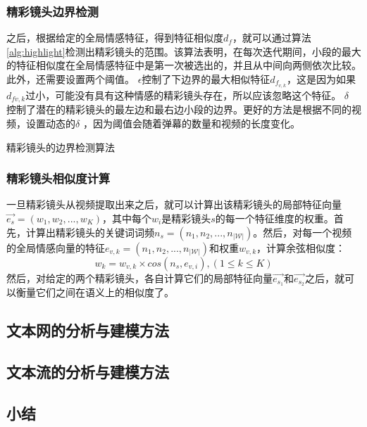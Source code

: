 \subsubsection{精彩镜头边界检测}
之后，根据给定的全局情感特征，得到特征相似度$d_f$，就可以通过算法\ref{alg:highlight}检测出精彩镜头的范围。该算法表明，在每次迭代期间，小段的最大的特征相似度在全局情感特征中是第一次被选出的，并且从中间向两侧依次比较。此外，还需要设置两个阈值。 $\epsilon$控制了下边界的最大相似特征$d_{f_{v,k}}$，这是因为如果$d_{f{v,k}}$过小，可能没有具有这种情感的精彩镜头存在，所以应该忽略这个特征。 $\delta$ 控制了潜在的精彩镜头的最左边和最右边小段的边界。更好的方法是根据不同的视频，设置动态的$\delta$ ，因为阈值会随着弹幕的数量和视频的长度变化。
\begin{algorithm}
\caption{精彩镜头的边界检测算法}
\label{alg:highlight}
\end{algorithm}

\subsubsection{精彩镜头相似度计算}
一旦精彩镜头从视频提取出来之后，就可以计算出该精彩镜头的局部特征向量$\vec{e_s}=(w_1, w_2,..., w_K)$，其中每个$w_i$是精彩镜头$s$的每一个特征维度的权重。首先，计算出精彩镜头的关键词词频$n_s=(n_1, n_2,..., n_{|\mathcal{W}|})$。然后，对每一个视频的全局情感向量的特征$e_{v,k}=(n_1, n_2,...,n_{|\mathcal{W}|})$和权重$w_{v,k}$，计算余弦相似度：
\begin{equation}
  w_k=w_{v,k}\times cos(n_s, e_{v,i}), (1\le k\le K)
\end{equation}
然后，对给定的两个精彩镜头，各自计算它们的局部特征向量$\vec{e_{s_1}}$和$\vec{e_{s_2}}$之后，就可以衡量它们之间在语义上的相似度了。

\subsection{文本网的分析与建模方法}

\subsection{文本流的分析与建模方法}

\subsection{小结}
